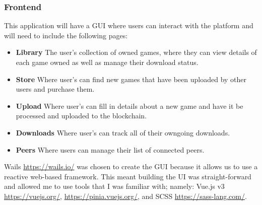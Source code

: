 \subsubsection*{Frontend}

This application will have a GUI where users can interact with the platform and will need to include the following pages:

\begin{itemize}
  \item \textbf{Library} The user's collection of owned games, where they can view details of each game owned as well as manage their download status.
  \item \textbf{Store} Where user's can find new games that have been uploaded by other users and purchase them.
  \item \textbf{Upload} Where user's can fill in details about a new game and have it be processed and uploaded to the blockchain.
  \item \textbf{Downloads} Where user's can track all of their owngoing downloads.
  \item \textbf{Peers} Where users can manage their list of connected peers.
\end{itemize}

\vspace{2mm}\noindent
Wails \url{https://wails.io/} was chosen to create the GUI because it allows us to use a reactive web-based framework. This meant building the UI was straight-forward and allowed me to use tools that I was familiar with; namely: Vue.js v3 \url{https://vuejs.org/}, \url{https://pinia.vuejs.org/}, and SCSS \url{https://sass-lang.com/}.